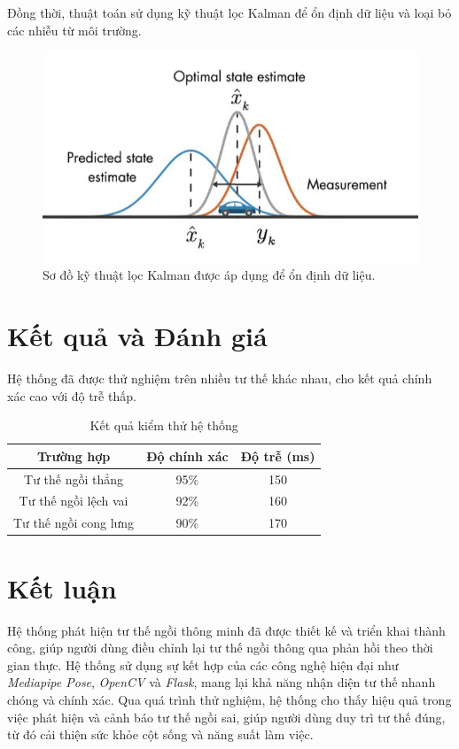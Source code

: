 \documentclass[conference]{IEEEtran}
\begin{document}
Đồng thời, thuật toán sử dụng kỹ thuật lọc Kalman để ổn định dữ liệu và loại bỏ các nhiễu từ môi trường.

\begin{figure}[h]
    \centering
    \includegraphics[width=0.9\linewidth]{images/kalman_filter.png}
    \caption{Sơ đồ kỹ thuật lọc Kalman được áp dụng để ổn định dữ liệu.}
    \label{fig:kalman_filter}
\end{figure}


\section{Kết quả và Đánh giá}
Hệ thống đã được thử nghiệm trên nhiều tư thế khác nhau, cho kết quả chính xác cao với độ trễ thấp.

\begin{table}[h]
\centering
\caption{Kết quả kiểm thử hệ thống}
\begin{tabular}{@{}ccc@{}}
\toprule
\textbf{Trường hợp} & \textbf{Độ chính xác} & \textbf{Độ trễ (ms)} \\
\midrule
Tư thế ngồi thẳng & 95\% & 150 \\
Tư thế ngồi lệch vai & 92\% & 160 \\
Tư thế ngồi cong lưng & 90\% & 170 \\
\bottomrule
\end{tabular}
\end{table}

\section{Kết luận}
Hệ thống phát hiện tư thế ngồi thông minh đã được thiết kế và triển khai thành công, giúp người dùng điều chỉnh lại tư thế ngồi thông qua phản hồi theo thời gian thực. Hệ thống sử dụng sự kết hợp của các công nghệ hiện đại như \textit{Mediapipe Pose}, \textit{OpenCV} và \textit{Flask}, mang lại khả năng nhận diện tư thế nhanh chóng và chính xác. Qua quá trình thử nghiệm, hệ thống cho thấy hiệu quả trong việc phát hiện và cảnh báo tư thế ngồi sai, giúp người dùng duy trì tư thế đúng, từ đó cải thiện sức khỏe cột sống và năng suất làm việc.  
\end{document}
